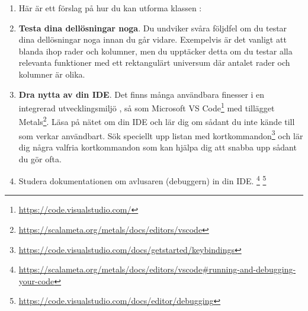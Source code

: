 \begin{enumerate}[leftmargin=*]
\item Här är ett förslag på hur du kan utforma klassen :

\item \textbf{Testa dina dellösningar noga}. Du undviker svåra följdfel om du testar dina dellösningar noga innan du går vidare. Exempelvis är det vanligt att blanda ihop rader och kolumner, men du upptäcker detta om du testar alla relevanta funktioner med ett rektangulärt universum där antalet rader och kolumner är olika.

\item \textbf{Dra nytta av din IDE}. Det finns många användbara finesser i en integrerad utvecklingsmiljö , så som Microsoft VS Code\footnote{\url{https://code.visualstudio.com/}} med tillägget Metals\footnote{\url{https://scalameta.org/metals/docs/editors/vscode}}. Läsa på nätet om din IDE och lär dig om sådant du inte kände till som verkar användbart. Sök speciellt upp listan med kortkommandon\footnote{\url{https://code.visualstudio.com/docs/getstarted/keybindings}} och lär dig några valfria kortkommandon som kan hjälpa dig att snabba upp sådant du gör ofta. 
\item Studera dokumentationen om avlusaren (debuggern) in din IDE. \footnote{\url{https://scalameta.org/metals/docs/editors/vscode\#running-and-debugging-your-code}}  \footnote{\url{https://code.visualstudio.com/docs/editor/debugging}} 
\end{enumerate}
